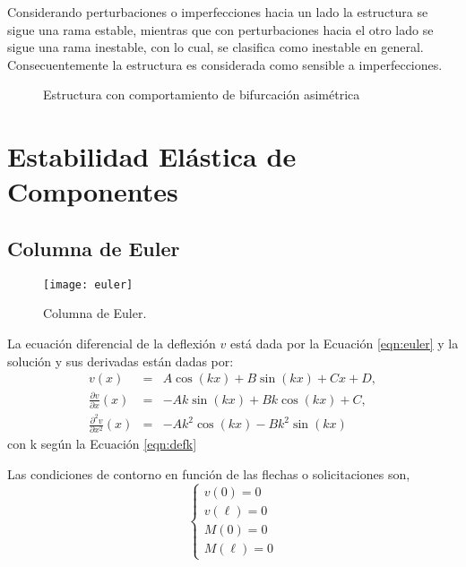 Considerando perturbaciones o imperfecciones hacia un lado la estructura se sigue una rama estable, mientras que con perturbaciones hacia el otro lado se sigue una rama inestable, con lo cual, se clasifica como inestable en general. Consecuentemente la estructura es considerada como sensible a imperfecciones.
\begin{figure}[htb]
	\centering
{}
\hspace{1em}
\caption{Estructura con comportamiento de bifurcación asimétrica}
	\label{fig:asimetrica}
\end{figure}


\section{Estabilidad Elástica de Componentes} \label{sec:componentes}

\subsection{Columna de Euler}


\begin{figure}[htb]
	\centering
	\texttt{[image: euler]}
	\caption{Columna de Euler.}
	\label{fig:euler}
\end{figure}

La ecuación diferencial de la deflexión $v$ está dada por la Ecuación \eqref{eqn:euler} y la solución y sus derivadas están dadas por:
\begin{eqnarray}
v(x) &=& A \cos(k x ) + B \sin(kx) + C x + D, \\
\frac{\partial   v}{\partial x  } (x) &=& -A k \sin(k x ) + B k \cos(kx) + C , \\
\frac{\partial^2 v}{\partial x^2} (x) &=& - A k^2 \cos(k x ) - B k^2 \sin(kx)
\end{eqnarray}
con k según la Ecuación \eqref{eqn:defk}

Las condiciones de contorno en función de las flechas o solicitaciones son,
\begin{equation}
\left\{
\begin{array}{l}
v(0)=0 \\[.5em]
\displaystyle v(\ell)=0\\[1em]
M(0)=0\\[.5em]
M(\ell)=0
\end{array}
\right.
\end{equation}

